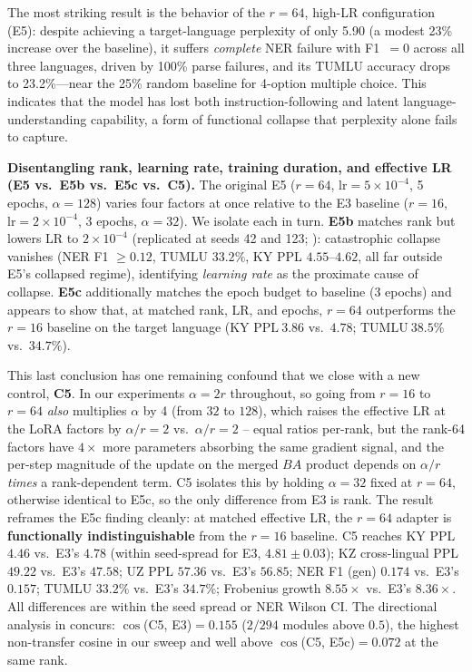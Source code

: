 \documentclass[11pt]{article}
\begin{document}
The most striking result is the behavior of the $r{=}64$, high-LR configuration (E5): despite achieving a target-language perplexity of only 5.90 (a modest 23\% increase over the baseline), it suffers \emph{complete} NER failure with F1~$= 0$ across all three languages, driven by 100\% parse failures, and its TUMLU accuracy drops to 23.2\%---near the 25\% random baseline for 4-option multiple choice. This indicates that the model has lost both instruction-following and latent language-understanding capability, a form of functional collapse that perplexity alone fails to capture.

\label{sec:spectral-collapse-rank-lr}
\textbf{Disentangling rank, learning rate, training duration, and effective LR (E5 vs.\ E5b vs.\ E5c vs.\ C5).} The original E5 ($r{=}64$, $\text{lr}{=}5{\times}10^{-4}$, 5 epochs, $\alpha{=}128$) varies four factors at once relative to the E3 baseline ($r{=}16$, $\text{lr}{=}2{\times}10^{-4}$, 3 epochs, $\alpha{=}32$). We isolate each in turn. \textbf{E5b} matches rank but lowers LR to $2{\times}10^{-4}$ (replicated at seeds 42 and 123; ): catastrophic collapse vanishes (NER F1 $\geq 0.12$, TUMLU $33.2\%$, KY PPL $4.55$--$4.62$, all far outside E5's collapsed regime), identifying \emph{learning rate} as the proximate cause of collapse. \textbf{E5c} additionally matches the epoch budget to baseline (3 epochs) and appears to show that, at matched rank, LR, and epochs, $r{=}64$ outperforms the $r{=}16$ baseline on the target language ($\text{KY PPL}~3.86$ vs.\ $4.78$; $\text{TUMLU}~38.5\%$ vs.\ $34.7\%$).

This last conclusion has one remaining confound that we close with a new control, \textbf{C5}. In our experiments $\alpha{=}2r$ throughout, so going from $r{=}16$ to $r{=}64$ \emph{also} multiplies $\alpha$ by 4 (from $32$ to $128$), which raises the effective LR at the LoRA factors by $\alpha/r = 2$ vs.\ $\alpha/r = 2$ -- equal ratios per-rank, but the rank-64 factors have $4\times$ more parameters absorbing the same gradient signal, and the per-step magnitude of the update on the merged $BA$ product depends on $\alpha/r$ \emph{times} a rank-dependent term. C5 isolates this by holding $\alpha{=}32$ fixed at $r{=}64$, otherwise identical to E5c, so the only difference from E3 is rank. The result reframes the E5c finding cleanly: at matched effective LR, the $r{=}64$ adapter is \textbf{functionally indistinguishable} from the $r{=}16$ baseline. C5 reaches KY PPL $4.46$ vs.\ E3's $4.78$ (within seed-spread for E3, $4.81 \pm 0.03$); KZ cross-lingual PPL $49.22$ vs.\ E3's $47.58$; UZ PPL $57.36$ vs.\ E3's $56.85$; NER F1 (gen) $0.174$ vs.\ E3's $0.157$; TUMLU $33.2\%$ vs.\ E3's $34.7\%$; Frobenius growth $8.55\times$ vs.\ E3's $8.36\times$. All differences are within the seed spread or NER Wilson CI. The directional analysis in  concurs: $\cos$(C5, E3)$=0.155$ ($2/294$ modules above $0.5$), the highest non-transfer cosine in our sweep and well above $\cos$(C5, E5c)$=0.072$ at the same rank.
\end{document}
